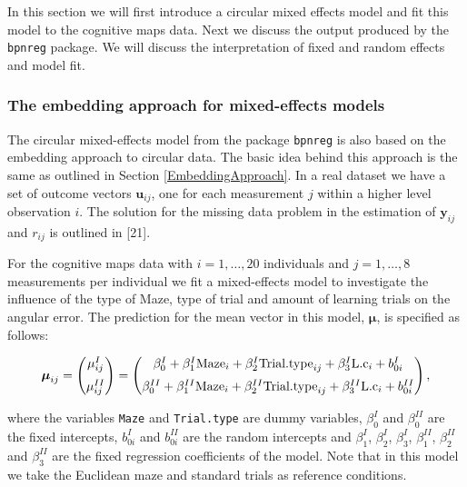 \documentclass[11pt,]{article}
\begin{document}
In this section we will first introduce a circular mixed effects model
and fit this model to the cognitive maps data. Next we discuss the
output produced by the \verb|bpnreg| package. We will discuss the
interpretation of fixed and random effects and model fit.

\subsubsection{The embedding approach for mixed-effects models}\label{embeddingME}

The circular mixed-effects model from the package \verb|bpnreg| is also
based on the embedding approach to circular data. The basic idea behind
this approach is the same as outlined in Section
\ref{EmbeddingApproach}. In a real dataset we have a set of outcome
vectors \(\boldsymbol{u}_{ij}\), one for each measurement \(j\) within a
higher level observation \(i\). The solution for the missing data
problem in the estimation of \(\boldsymbol{y}_{ij}\) and \(r_{ij}\) is
outlined in {[}21{]}.

For the cognitive maps data with \(i = 1, \dots, 20\) individuals and
\(j = 1, \dots, 8\) measurements per individual we fit a mixed-effects
model to investigate the influence of the type of Maze, type of trial
and amount of learning trials on the angular error. The prediction for
the mean vector in this model, \(\boldsymbol{\mu}\), is specified as
follows:

\begin{equation}\label{regressionmaps}
\boldsymbol{\mu}_{ij} = \begin{pmatrix}
  \mu_{ij}^{I}  \vspace{0.2cm}  \\
\mu_{ij}^{II}
 \end{pmatrix}=\begin{pmatrix}
  \beta_{0}^{I} +  \beta_{1}^{I}\text{Maze}_{i}+  \beta_{2}^{I}\text{Trial.type}_{ij} + \beta_{3}^{I}\text{L.c}_{i} + b_{0i}^{I} \vspace{0.2cm}  \\
  \beta_{0}^{II} +  \beta_{1}^{II}\text{Maze}_{i}+  \beta_{2}^{II}\text{Trial.type}_{ij} + \beta_{3}^{II}\text{L.c}_{i} + b_{0i}^{II}
 \end{pmatrix},
\end{equation}

where the variables \verb|Maze| and \verb|Trial.type| are dummy
variables, \(\beta_{0}^{I}\) and \(\beta_{0}^{II}\) are the fixed
intercepts, \(b_{0i}^{I}\) and \(b_{0i}^{II}\) are the random intercepts
and \(\beta_{1}^{I}\), \(\beta_{2}^{I}\), \(\beta_{3}^{I}\),
\(\beta_{1}^{II}\), \(\beta_{2}^{II}\) and \(\beta_{3}^{II}\) are the
fixed regression coefficients of the model. Note that in this model we
take the Euclidean maze and standard trials as reference conditions.
\end{document}
